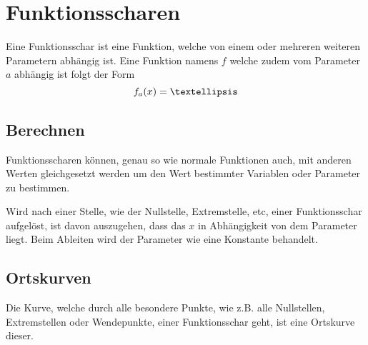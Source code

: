 \documentclass{article}
\begin{document}
 
\section{Funktionsscharen}
 
\begin{minipage}[t]{\dimexpr\textwidth-5cm}
 Eine Funktionsschar ist eine Funktion, welche von einem oder mehreren weiteren Parametern abhängig ist. Eine Funktion namens $f$ welche zudem vom Parameter $a$ abhängig ist folgt der Form
 \[
  f_a(x) = \textellipsis
 \]
 
\subsection{Berechnen}
 Funktionsscharen können, genau so wie normale Funktionen auch, mit anderen Werten gleichgesetzt werden um den Wert bestimmter Variablen oder Parameter zu bestimmen.
\vspace{0.4em}
 
\end{minipage}
\hfill
\begin{minipage}[t]{5cm}
  \centering
\end{minipage}
Wird nach einer Stelle, wie der Nullstelle, Extremstelle, etc, einer Funktionsschar aufgelöst, ist davon auszugehen, dass das $x$ in Abhängigkeit von dem Parameter liegt.   
Beim Ableiten wird der Parameter wie eine Konstante behandelt. 
 
\subsection{Ortskurven}
Die Kurve, welche durch alle besondere Punkte, wie z.B. alle Nullstellen, Extremstellen oder Wendepunkte, einer Funktionsschar geht, ist eine Ortskurve dieser.
 
\end{document}
